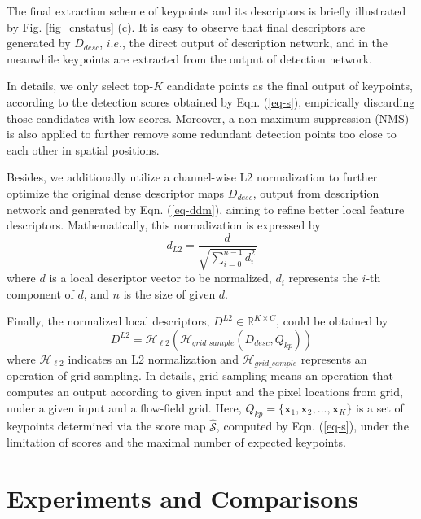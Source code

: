 \documentclass[journal]{IEEEtran}
\begin{document}
The final extraction scheme of keypoints and its descriptors is briefly illustrated by Fig. \ref{fig_cnstatus} (c). 
It is easy to observe that final descriptors are generated by $D_{desc}$, $i.e.$, the direct output of description network, and in the meanwhile keypoints are extracted from the output of detection network.

In details, we only select top-$K$ candidate points 
as the final output of keypoints, according to the detection scores obtained by Eqn. (\ref{eq-s}), empirically discarding those candidates with low scores. Moreover, a non-maximum suppression (NMS) \cite{NMS} is also applied to further remove some redundant detection points too close to each other in spatial positions. 



Besides, we additionally utilize a channel-wise L2 normalization to further optimize the original dense descriptor maps $D_{desc}$, output from description network and generated by Eqn. (\ref{eq-ddm}),
 aiming to refine better local feature descriptors. 
Mathematically, this normalization is expressed by
\begin{equation}\label{eq-l2}
        d_{L2}=\frac{d}{\sqrt{\sum_{i=0}^{n-1}{d_{i}^{2}}}}
\end{equation}
where $d$ is a local descriptor vector to be normalized, $d_i$ represents the $i$-th component of $d$, and $n$ is the size of given $d$.

Finally, the normalized local descriptors, $D^{L2}\in\mathbb{R}^{K\times C}$, could be obtained by
\begin{equation}\label{eq-dd}
        D^{L2}=\mathcal{H}_{\ell 2}(\mathcal{H}_{grid\_sample}(D_{desc},Q_{kp}))
\end{equation}
where $\mathcal{H}_{\ell 2}$ indicates an L2 normalization and $\mathcal{H}_{grid\_sample}$ represents an operation of grid sampling. In details, grid sampling means an operation that computes an output according to given input and the pixel locations from grid, under a given input and a flow-field grid. Here, $Q_{kp}=\{\boldsymbol{x}_{1},\boldsymbol{x}_{2},...,\boldsymbol{x}_{K}\}$ is a set of keypoints determined via the score map $\widehat{\mathcal{S}}$, computed by Eqn. (\ref{eq-s}), under the limitation of scores and the maximal number of expected keypoints.

\section{Experiments and Comparisons}
\end{document}
